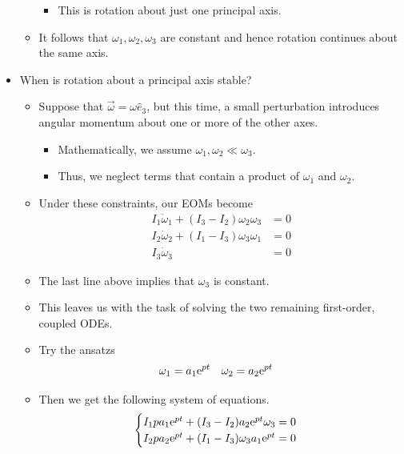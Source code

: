 \documentclass[../notes.tex]{subfiles}
\begin{document}
\begin{itemize}
\begin{itemize}
        \begin{itemize}
            \item This is rotation about just one principal axis.
        \end{itemize}
        \item It follows that $\omega_1,\omega_2,\omega_3$ are constant and hence rotation continues about the same axis.
    \end{itemize}
    \item When is rotation about a principal axis stable?
    \begin{itemize}
        \item Suppose that $\vec{\omega}=\omega\hat{e}_3$, but this time, a small perturbation introduces angular momentum about one or more of the other axes.
        \begin{itemize}
            \item Mathematically, we assume $\omega_1,\omega_2\ll\omega_3$.
            \item Thus, we neglect terms that contain a product of $\omega_1$ and $\omega_2$.
        \end{itemize}
        \item Under these constraints, our EOMs become
        \begin{align*}
            I_1\dot{\omega}_1+(I_3-I_2)\omega_2\omega_3 &= 0\\
            I_2\dot{\omega}_2+(I_1-I_3)\omega_3\omega_1 &= 0\\
            I_3\dot{\omega}_3 &= 0
        \end{align*}
        \item The last line above implies that $\omega_3$ is constant.
        \item This leaves us with the task of solving the two remaining first-order, coupled ODEs.
        \item Try the ansatzs
        \begin{align*}
            \omega_1 &= a_1\e[pt]&
            \omega_2 &= a_2\e[pt]
        \end{align*}
        \item Then we get the following system of equations.
        \begin{equation*}
            \begin{cases}
                I_1pa_1\e[pt]+(I_3-I_2)a_2\e[pt]\omega_3 = 0\\
                I_2pa_2\e[pt]+(I_1-I_3)\omega_3a_1\e[pt] = 0
            \end{cases}

\end{equation*}
\end{itemize}
\end{itemize}
\end{document}
